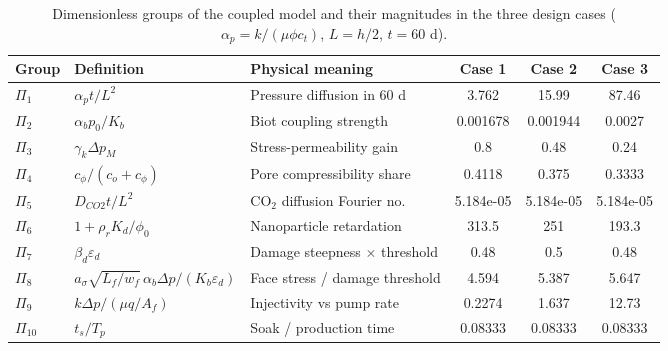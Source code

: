 \begin{table}[htbp]
\centering
\scriptsize
\setlength{\tabcolsep}{4pt}
\caption{Dimensionless groups of the coupled model and their magnitudes in the three design cases ($\alpha_p=k/(\mu\phi c_t)$, $L=h/2$, $t=60$ d).}
\label{tab:pi}
\begin{tabular}{@{}llp{4.3cm}ccc@{}}
\toprule
Group & Definition & Physical meaning & Case 1 & Case 2 & Case 3 \\
\midrule
$\Pi_{1}$ & $\alpha_p t/L^2$ & Pressure diffusion in 60 d & 3.762 & 15.99 & 87.46 \\
$\Pi_{2}$ & $\alpha_b p_0/K_b$ & Biot coupling strength & 0.001678 & 0.001944 & 0.0027 \\
$\Pi_{3}$ & $\gamma_k\Delta p_{M}$ & Stress-permeability gain & 0.8 & 0.48 & 0.24 \\
$\Pi_{4}$ & $c_\phi/(c_o+c_\phi)$ & Pore compressibility share & 0.4118 & 0.375 & 0.3333 \\
$\Pi_{5}$ & $D_{CO2}t/L^2$ & CO$_2$ diffusion Fourier no. & 5.184e-05 & 5.184e-05 & 5.184e-05 \\
$\Pi_{6}$ & $1+\rho_r K_d/\phi_0$ & Nanoparticle retardation & 313.5 & 251 & 193.3 \\
$\Pi_{7}$ & $\beta_d\varepsilon_d$ & Damage steepness $\times$ threshold & 0.48 & 0.5 & 0.48 \\
$\Pi_{8}$ & $a_\sigma\sqrt{L_f/w_f}\,\alpha_b\Delta p/(K_b\varepsilon_d)$ & Face stress / damage threshold & 4.594 & 5.387 & 5.647 \\
$\Pi_{9}$ & $k\Delta p/(\mu q/A_{f})$ & Injectivity vs pump rate & 0.2274 & 1.637 & 12.73 \\
$\Pi_{10}$ & $t_{s}/T_{p}$ & Soak / production time & 0.08333 & 0.08333 & 0.08333 \\
\bottomrule
\end{tabular}
\end{table}
